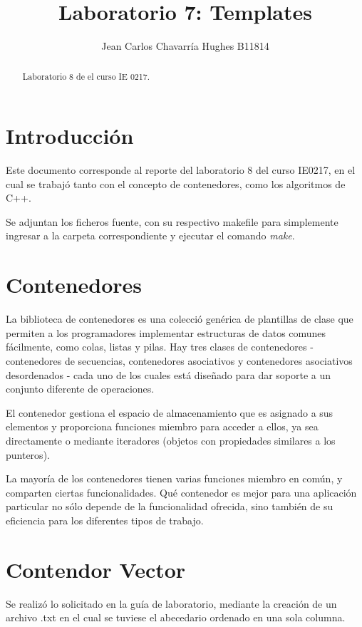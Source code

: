 \documentclass{article}
\begin{document}
\title{Laboratorio 7: Templates}
\author{Jean Carlos Chavarr\' ia Hughes B11814}
\maketitle
\begin{abstract}
Laboratorio 8 de el curso IE 0217.
\end{abstract}
\section{Introducci\' on}
Este documento corresponde al reporte del laboratorio 8 del curso IE0217, en el cual se trabaj\' o tanto con el concepto de contenedores, como los algoritmos de C++.

Se adjuntan los ficheros fuente, con su respectivo makefile para simplemente ingresar a la carpeta correspondiente y ejecutar el comando \textit{make}.

\section{Contenedores}
La biblioteca de contenedores es una colecci\' o gen\' erica de plantillas de clase que permiten a los programadores implementar estructuras de datos comunes f\' acilmente, como colas, listas y pilas. Hay tres clases de contenedores - contenedores de secuencias, contenedores asociativos y contenedores asociativos desordenados - cada uno de los cuales está dise\~ nado para dar soporte a un conjunto diferente de operaciones.

El contenedor gestiona el espacio de almacenamiento que es asignado a sus elementos y proporciona funciones miembro para acceder a ellos, ya sea directamente o mediante iteradores (objetos con propiedades similares a los punteros).

La mayor\' ia de los contenedores tienen varias funciones miembro en com\' un, y comparten ciertas funcionalidades. Qu\' e contenedor es mejor para una aplicaci\' on particular no s\' olo depende de la funcionalidad ofrecida, sino también de su eficiencia para los diferentes tipos de trabajo. 

\section{Contendor Vector}
Se realiz\' o lo solicitado en la gu\' ia de laboratorio, mediante la creaci\' on de un archivo .txt en el cual se tuviese el abecedario ordenado en una sola columna. 
\end{document}
